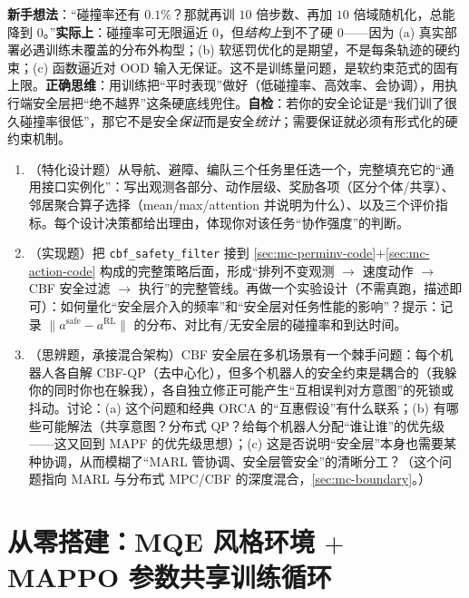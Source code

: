 \begin{pitfall}
\textbf{新手想法}：“碰撞率还有 $0.1\%$？那就再训 $10$ 倍步数、再加 $10$ 倍域随机化，总能降到 $0$。”\textbf{实际上}：碰撞率可无限逼近 $0$，但\emph{结构上}到不了硬 $0$——因为 (a) 真实部署必遇训练未覆盖的分布外构型；(b) 软惩罚优化的是期望，不是每条轨迹的硬约束；(c) 函数逼近对 OOD 输入无保证。这不是训练量问题，是软约束范式的固有上限。\textbf{正确思维}：用训练把“平时表现”做好（低碰撞率、高效率、会协调），用执行端安全层把“绝不越界”这条硬底线兜住。\textbf{自检}：若你的安全论证是“我们训了很久碰撞率很低”，那它不是安全\emph{保证}而是安全\emph{统计}；需要保证就必须有形式化的硬约束机制。
\end{pitfall}

\begin{practice}
\begin{enumerate}
  \item （特化设计题）从导航、避障、编队三个任务里任选一个，完整填充它的“通用接口实例化”：写出观测各部分、动作层级、奖励各项（区分个体/共享）、邻居聚合算子选择（mean/max/attention 并说明为什么）、以及三个评价指标。每个设计决策都给出理由，体现你对该任务“协作强度”的判断。
  \item （实现题）把 \verb|cbf_safety_filter| 接到 \cref{sec:mc-perminv-code}$+$\cref{sec:mc-action-code} 构成的完整策略后面，形成“排列不变观测 $\to$ 速度动作 $\to$ CBF 安全过滤 $\to$ 执行”的完整管线。再做一个实验设计（不需真跑，描述即可）：如何量化“安全层介入的频率”和“安全层对任务性能的影响”？提示：记录 $\|a^{\text{safe}}-a^{\mathrm{RL}}\|$ 的分布、对比有/无安全层的碰撞率和到达时间。
  \item （思辨题，承接混合架构）CBF 安全层在多机场景有一个棘手问题：每个机器人各自解 CBF-QP（去中心化），但多个机器人的安全约束是耦合的（我躲你的同时你也在躲我），各自独立修正可能产生“互相误判对方意图”的死锁或抖动。讨论：(a) 这个问题和经典 ORCA 的“互惠假设”有什么联系；(b) 有哪些可能解法（共享意图？分布式 QP？给每个机器人分配“谁让谁”的优先级——这又回到 MAPF 的优先级思想）；(c) 这是否说明“安全层”本身也需要某种协调，从而模糊了“MARL 管协调、安全层管安全”的清晰分工？（这个问题指向 MARL 与分布式 MPC/CBF 的深度混合，\cref{sec:mc-boundary}。）
\end{enumerate}
\end{practice}

\section{从零搭建：MQE 风格环境 $+$ MAPPO 参数共享训练循环}
\label{sec:mc-train}

